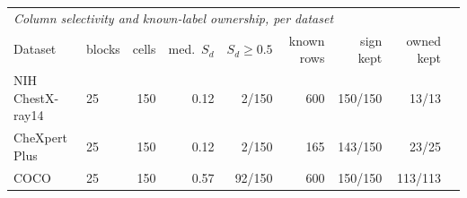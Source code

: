 \begin{table}[h]
\begin{tabular}{llrrrrrrr}
\midrule
\multicolumn{9}{l}{\textit{Column selectivity and known-label ownership, per dataset}} \\
Dataset & blocks & cells & med.\ $S_d$ & $S_d\geq0.5$ & known rows & sign kept & owned kept & \\
\midrule
NIH ChestX-ray14 & 25 & 150 & 0.12 & 2/150 & 600 & 150/150 & 13/13 & \\
CheXpert Plus & 25 & 150 & 0.12 & 2/150 & 165 & 143/150 & 23/25 & \\
COCO & 25 & 150 & 0.57 & 92/150 & 600 & 150/150 & 113/113 & \\
\bottomrule
\end{tabular}
\end{table}
